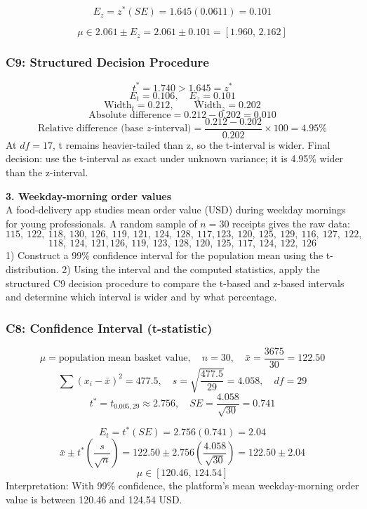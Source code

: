 \begin{ExamProblems}
		\[
		E_z=z^*(SE)=1.645(0.0611)=0.101
		\]

		\[
		\mu\in 2.061\pm E_z=2.061\pm 0.101=[1.960,\,2.162]
		\]

		\subsubsection*{C9: Structured Decision Procedure}
		\[
		t^*=1.740>1.645=z^*
		\]
		\[
		E_t=0.106,\quad E_z=0.101
		\]
		\[
		\text{Width}_t=0.212,\qquad \text{Width}_z=0.202
		\]
		\[
		\text{Absolute difference}=0.212-0.202=0.010
		\]
		\[
		\text{Relative difference (base }z\text{-interval)}=\frac{0.212-0.202}{0.202}\times 100=4.95\%
		\]
		At $df=17$, t remains heavier-tailed than z, so the t-interval is wider.
		Final decision: use the t-interval as exact under unknown variance; it is 4.95\% wider than the z-interval.

		\newpage
		\item
		\textbf{3. Weekday-morning order values}\\
		A food-delivery app studies mean order value (USD) during weekday mornings for young professionals.
		A random sample of $n=30$ receipts gives the raw data:
		\[
		115,\ 122,\ 118,\ 130,\ 126,\ 119,\ 121,\ 124,\ 128,\ 117,
		123,\ 120,\ 125,\ 129,\ 116,\ 127,\ 122,\]
		\[	 118,\ 124,\ 121,
		126,\ 119,\ 123,\ 128,\ 120,\ 125,\ 117,\ 124,\ 122,\ 126
		\]
		1) Construct a 99\% confidence interval for the population mean using the t-distribution.
		2) Using the interval and the computed statistics, apply the structured C9 decision procedure to compare the t-based and z-based intervals and determine which interval is wider and by what percentage.

		\subsubsection*{C8: Confidence Interval (t-statistic)}
		\[
		\mu=\text{population mean basket value},\quad n=30,\quad \bar{x}=\frac{3675}{30}=122.50
		\]
		\[
		\sum (x_i-\bar{x})^2=477.5,\quad s=\sqrt{\frac{477.5}{29}}=4.058,\quad df=29
		\]
		\[
		t^*=t_{0.005,29}\approx 2.756,\quad SE=\frac{4.058}{\sqrt{30}}=0.741
		\]

		\[
		E_t=t^*(SE)=2.756(0.741)=2.04
		\]
		\[
		\bar{x}\pm t^*\left(\frac{s}{\sqrt{n}}\right)=122.50\pm 2.756\left(\frac{4.058}{\sqrt{30}}\right)=122.50\pm 2.04
		\]
		\[
		\mu\in[120.46,\,124.54]
		\]
		Interpretation: With 99\% confidence, the platform's mean weekday-morning order value is between 120.46 and 124.54 USD.


\end{ExamProblems}
